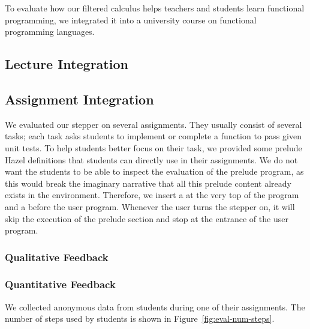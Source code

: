 
To evaluate how our filtered calculus helps teachers and students learn
functional programming, we integrated it into a university course on
functional programming languages.

\subsection{Lecture Integration}


\subsection{Assignment Integration}

We evaluated our stepper on several assignments. They usually consist of
several tasks; each task asks students to implement or complete a function to
pass given unit tests. To help students better focus on their task, we
provided some prelude Hazel definitions that students can directly use in their
assignments. We do not want the students to be able to inspect the evaluation of
the prelude program, as this would break the imaginary narrative that all this
prelude content already exists in the environment. Therefore, we insert a
 at the very top of the program and a
 before the user program. Whenever the
user turns the stepper on, it will skip the execution of the prelude section and
stop at the entrance of the user program.

\subsubsection{Qualitative Feedback}


\subsubsection{Quantitative Feedback}

We collected anonymous data from students during one of their
assignments. The number of steps used by students is shown in
Figure~\ref{fig:eval-num-steps}.

